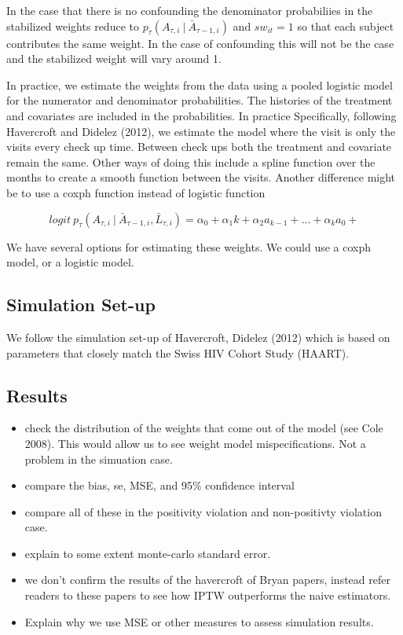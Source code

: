 \documentclass[11pt]{article}
\begin{document}
In the case that there is no confounding the denominator probabiliies in
the stabilized weights reduce to
\(p_{\tau} (A_{\tau, i}\ |\ \bar A_{\tau-1, i})\) and \(sw_{it}=1\) so
that each subject contributes the same weight. In the case of
confounding this will not be the case and the stabilized weight will
vary around 1.

In practice, we estimate the weights from the data using a pooled
logistic model for the numerator and denominator probabilities. The
histories of the treatment and covariates are included in the
probabilities. In practice Specifically, following Havercroft and
Didelez (2012), we estimate the model where the visit is only the visits
every check up time. Between check ups both the treatment and covariate
remain the same. Other ways of doing this include a spline function over
the months to create a smooth function between the visits. Another
difference might be to use a coxph function instead of logistic function

\[logit\ p_{\tau} (A_{\tau, i}\ |\ \bar A_{\tau-1, i}, \bar L_{\tau, i}) = \alpha_0 + \alpha_1 k + \alpha_2 a_{k-1} + \dots + \alpha_k a_0 + \]

We have several options for estimating these weights. We could use a
coxph model, or a logistic model.

\subsection{Simulation Set-up}\label{simulation-set-up}

We follow the simulation set-up of Havercroft, Didelez (2012) which is
based on parameters that closely match the Swiss HIV Cohort Study
(HAART).

\subsection{Results}\label{results}

\begin{itemize}
\item
  check the distribution of the weights that come out of the model (see
  Cole 2008). This would allow us to see weight model mispecifications.
  Not a problem in the simuation case.
\item
  compare the bias, se, MSE, and 95\% confidence interval
\item
  compare all of these in the positivity violation and non-positivty
  violation case.
\item
  explain to some extent monte-carlo standard error.
\item
  we don't confirm the results of the havercroft of Bryan papers,
  instead refer readers to these papers to see how IPTW outperforms the
  naive estimators.
\item
  Explain why we use MSE or other measures to assess simulation results.
\end{itemize}
\end{document}

